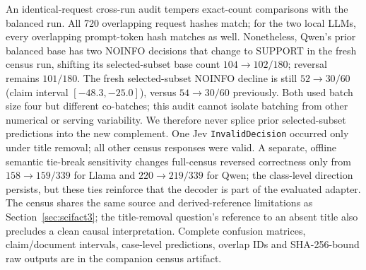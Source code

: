An identical-request cross-run audit tempers exact-count comparisons with the balanced run. All 720 overlapping request hashes match; for the two local LLMs, every overlapping prompt-token hash matches as well. Nonetheless, Qwen's prior balanced base has two NOINFO decisions that change to SUPPORT in the fresh census run, shifting its selected-subset base count $104\to102/180$; reversal remains $101/180$. The fresh selected-subset NOINFO decline is still $52\to30/60$ (claim interval $[-48.3,-25.0]$), versus $54\to30/60$ previously. Both used batch size four but different co-batches; this audit cannot isolate batching from other numerical or serving variability. We therefore never splice prior selected-subset predictions into the new complement. One Jev \texttt{InvalidDecision} occurred only under title removal; all other census responses were valid. A separate, offline semantic tie-break sensitivity changes full-census reversed correctness only from $158\to159/339$ for Llama and $220\to219/339$ for Qwen; the class-level direction persists, but these ties reinforce that the decoder is part of the evaluated adapter. The census shares the same source and derived-reference limitations as Section~\ref{sec:scifact3}; the title-removal question's reference to an absent title also precludes a clean causal interpretation. Complete confusion matrices, claim/document intervals, case-level predictions, overlap IDs and SHA-256-bound raw outputs are in the companion census artifact.
